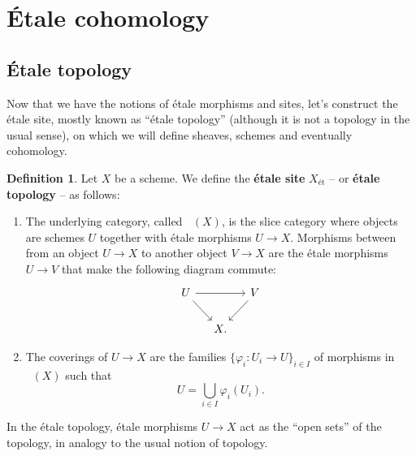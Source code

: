 \documentclass{report}
\DeclareMathOperator{\Et}{\acute{E}t}
\theoremstyle{definition}
\newtheorem{definition}[equation]{Definition}
\begin{document}
\section{\'{E}tale cohomology}

\subsection{\'{E}tale topology}

Now that we have the notions of \'{e}tale morphisms and sites, let's construct the \'{e}tale site, mostly known as ``\'{e}tale topology'' (although it is not a topology in the usual sense), on which we will define sheaves, schemes and eventually cohomology.

\begin{definition}
Let $X$ be a scheme. We define the \textbf{\'{e}tale site} $X_{\text{\'{e}t}}$ -- or \textbf{\'{e}tale topology} -- as follows:
\begin{enumerate}
\item The underlying category, called $\Et(X)$, is the slice category where objects are schemes $U$ together with \'{e}tale morphisms $U\rightarrow X$. Morphisms between from an object $U\rightarrow X$ to another object $V\rightarrow X$ are the \'{e}tale morphisms $U\rightarrow V$ that make the following diagram commute:
\[
\begin{tikzcd}[column sep=small]
U\arrow[rr]\arrow[rd]&&V\arrow[ld]\\
&X.
\end{tikzcd}
\]

\item The coverings of $U\rightarrow X$ are the families $\{\varphi_i:U_i\rightarrow U\}_{i\in I}$ of morphisms in $\Et(X)$ such that
\[U=\bigcup_{i\in I}\varphi_i(U_i).\]
\end{enumerate}
\end{definition}
In the \'{e}tale topology, \'{e}tale morphisms $U\rightarrow X$ act as the ``open sets'' of the topology, in analogy to the usual notion of topology.
\end{document}
